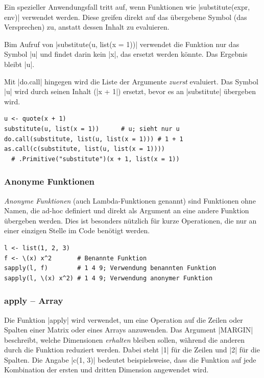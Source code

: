 \documentclass[10pt,twocolumn]{scrartcl}
\renewcommand{\lstinline}{\mycoloredinline}
\begin{document}
Ein spezieller Anwendungsfall tritt auf, wenn Funktionen wie \lstinline|substitute(expr, env)| verwendet werden. Diese greifen direkt auf das übergebene Symbol (das Versprechen) zu, anstatt dessen Inhalt zu evaluieren.

Bim Aufruf von \lstinline|substitute(u, list(x = 1))| verwendet die Funktion nur das Symbol \lstinline|u| und findet darin kein \lstinline|x|, das ersetzt werden könnte. Das Ergebnis bleibt \lstinline|u|.

Mit \lstinline|do.call| hingegen wird die Liste der Argumente \emph{zuerst} evaluiert. Das Symbol \lstinline|u| wird durch seinen Inhalt (\lstinline|x + 1|) ersetzt, bevor es an \lstinline|substitute| übergeben wird.

\begin{lstlisting}
u <- quote(x + 1)
substitute(u, list(x = 1))      # u; sieht nur u
do.call(substitute, list(u, list(x = 1))) # 1 + 1
as.call(c(substitute, list(u, list(x = 1))))
  # .Primitive("substitute")(x + 1, list(x = 1))
\end{lstlisting}


\subsubsection{Anonyme Funktionen}

\emph{Anonyme Funktionen} (auch Lambda-Funktionen genannt) sind Funktionen ohne Namen, die ad-hoc definiert und direkt als Argument an eine andere Funktion übergeben werden. Dies ist besonders nützlich für kurze Operationen, die nur an einer einzigen Stelle im Code benötigt werden.

\begin{lstlisting}
l <- list(1, 2, 3)
f <- \(x) x^2       # Benannte Funktion
sapply(l, f)        # 1 4 9; Verwendung benannten Funktion
sapply(l, \(x) x^2) # 1 4 9; Verwendung anonymer Funktion
\end{lstlisting}


\subsubsection{apply -- Array}

Die Funktion \lstinline|apply| wird verwendet, um eine Operation auf die Zeilen oder Spalten einer Matrix oder eines Arrays anzuwenden. Das Argument \lstinline|MARGIN| beschreibt, welche Dimensionen \emph{erhalten} bleiben sollen, während die anderen durch die Funktion reduziert werden. Dabei steht \lstinline|1| für die Zeilen und \lstinline|2| für die Spalten. Die Angabe \lstinline|c(1, 3)| bedeutet beispielsweise, dass die Funktion auf jede Kombination der ersten und dritten Dimension angewendet wird.
\end{document}
